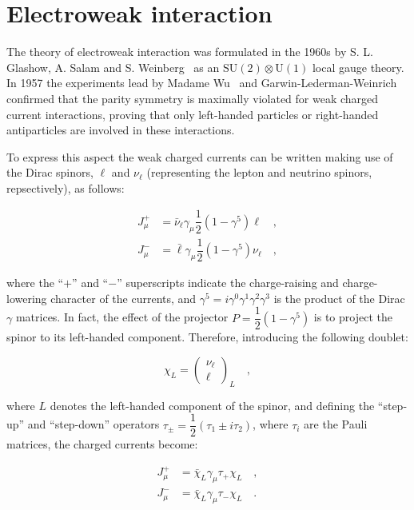 \section{Electroweak interaction}
\label{sec:EW}

The theory of electroweak interaction was formulated in the 1960s by S. L. Glashow, A. Salam and S. Weinberg~\cite{Glashow:1961tr,Weinberg:1967tq} as an $\mathrm{SU(2) \otimes U(1)}$ local gauge theory.
In 1957 the experiments lead by Madame Wu~\cite{Wu:1957my} and Garwin-Lederman-Weinrich~\cite{Garwin:1957hc} confirmed that the parity symmetry is maximally violated for weak charged current interactions, proving that only left-handed particles or right-handed antiparticles are involved in these interactions. 

To express this aspect the weak charged currents can be written making use of the Dirac spinors, $\ell$ and $\nu_\ell$ (representing the lepton and neutrino spinors, repsectively), as follows:

\begin{equation}
\begin{split}
J_\mu^+ &= \bar{\nu}_\ell \gamma_\mu \dfrac{1}{2}(1-\gamma^5) \ell \quad, \\
J_\mu^- &= \bar{\ell} \gamma_\mu \dfrac{1}{2}(1-\gamma^5)\nu_\ell \quad,
\end{split}
\end{equation}

where the ``$+$'' and ``$-$'' superscripts indicate the charge-raising and charge-lowering character of the currents, and $\gamma^5 = i\gamma^0\gamma^1\gamma^2\gamma^3$ is the product of the Dirac $\gamma$ matrices. In fact, the effect of the projector $P=\dfrac{1}{2}(1-\gamma^5)$ is to project the spinor to its left-handed component. Therefore, introducing the following doublet:

\begin{equation}
\chi_L = \begin{pmatrix} \nu_\ell \\ \ell \end{pmatrix}_L \quad ,
\end{equation}

where $L$ denotes the left-handed component of the spinor, and defining the ``step-up'' and ``step-down'' operators $\tau_\pm = \dfrac{1}{2}(\tau_1 \pm i\tau_2)$, where $\tau_i$ are the Pauli matrices, the charged currents become:

\begin{equation}
\begin{split}
J_\mu^+ &= \bar{\chi}_L \gamma_\mu \tau_+ \chi_L \quad, \\
J_\mu^- &= \bar{\chi}_L \gamma_\mu \tau_- \chi_L \quad.
\end{split}
\end{equation}

